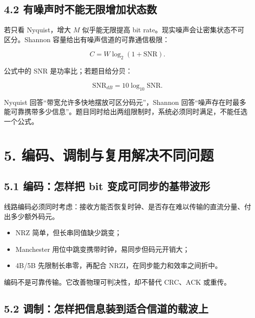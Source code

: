 \documentclass[UTF8,fontset=none,11pt,a4paper]{ctexart}
\providecommand{\tightlist}{\setlength{\itemsep}{0pt}\setlength{\parskip}{0pt}}
\begin{document}
\subsection{4.2
有噪声时不能无限增加状态数}\label{32-ux6709ux566aux58f0ux65f6ux4e0dux80fdux65e0ux9650ux589eux52a0ux72b6ux6001ux6570}

若只看 Nyquist，增大 \(M\) 似乎能无限提高 bit
rate。现实噪声会让密集状态不可区分。Shannon
容量给出有噪声信道的可靠通信极限：

\[
C=W\log_2(1+\mathrm{SNR}).
\]

公式中的 SNR 是功率比；若题目给分贝：

\[
\mathrm{SNR}_{dB}=10\log_{10}\mathrm{SNR}.
\]

Nyquist 回答``带宽允许多快地摆放可区分码元''，Shannon
回答``噪声存在时最多能可靠携带多少信息''。题目同时给出两组限制时，系统必须同时满足，不能任选一个公式。

\section{5.
编码、调制与复用解决不同问题}\label{4-ux7f16ux7801ux8c03ux5236ux4e0eux590dux7528ux89e3ux51b3ux4e0dux540cux95eeux9898}

\subsection{5.1 编码：怎样把 bit
变成可同步的基带波形}\label{41-ux7f16ux7801ux600eux6837ux628a-bit-ux53d8ux6210ux53efux540cux6b65ux7684ux57faux5e26ux6ce2ux5f62}

线路编码必须同时考虑：接收方能否恢复时钟、是否存在难以传输的直流分量、付出多少额外码元。

\begin{itemize}
\tightlist
\item
  NRZ 简单，但长串同值缺少跳变；
\item
  Manchester 用位中跳变携带时钟，易同步但码元开销大；
\item
  4B/5B 先限制长串零，再配合 NRZI，在同步能力和效率之间折中。
\end{itemize}

编码不是可靠传输。它改善物理可判决性，却不替代 CRC、ACK 或重传。

\subsection{5.2
调制：怎样把信息装到适合信道的载波上}\label{42-ux8c03ux5236ux600eux6837ux628aux4fe1ux606fux88c5ux5230ux9002ux5408ux4fe1ux9053ux7684ux8f7dux6ce2ux4e0a}
\end{document}
